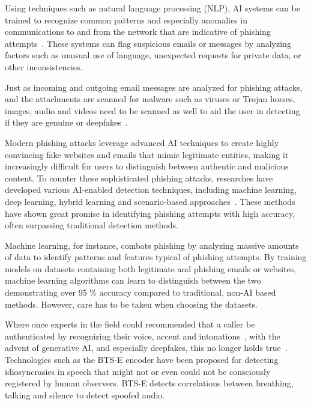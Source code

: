 Using techniques such as natural language processing (NLP), AI systems can be trained to recognize common patterns and especially anomalies in communications to and from the network that are indicative of phishing attempts~\citep{basit_Comprehensive_Survey_AI_Phishing_Detection_2021}. These systems can flag suspicious emails or messages by analyzing factors such as unusual use of language, unexpected requests for private data, or other inconsistencies.

Just as incoming and outgoing email messages are analyzed for phishing attacks, and the attachments are scanned for malware such as viruses or Trojan horses, images, audio and videos need to be scanned as well to aid the user in detecting if they are genuine or deepfakes~\citep{mirsky_Creation_Detection_Deepfakes_2021}.


Modern phishing attacks leverage advanced AI techniques to create highly convincing fake websites and emails that mimic legitimate entities, making it increasingly difficult for users to distinguish between authentic and malicious content. To counter these sophisticated phishing attacks, researches have developed various AI-enabled detection techniques, including machine learning, deep learning, hybrid learning and scenario-based approaches~\citep{basit_Comprehensive_Survey_AI_Phishing_Detection_2021}. These methods have shown great promise in identifying phishing attempts with high accuracy, often surpassing traditional detection methods.

Machine learning, for instance, combats phishing by analyzing massive amounts of data to identify patterns and features typical of phishing attempts. By training models on datasets containing both legitimate and phishing emails or websites, machine learning algorithms can learn to distinguish between the two demonstrating over 95 \% accuracy compared to traditional, non-AI based methods. However, care has to be taken when choosing the datasets.


Where once experts in the field could recommended that a caller be authenticated by recognizing their voice, accent and intonations~\citep{mitnick_The_Art_of_Deception_2003}, with the advent of generative AI, and especially deepfakes, this no longer holds true~\citep{doan_BTSE_Audio_Deepfake_Detection_2023}. Technologies such as the BTS-E encoder have been proposed for detecting idiosyncrasies in speech that might not or even could not be consciously registered by human observers. BTS-E detects correlations between breathing, talking and silence to detect spoofed audio.

